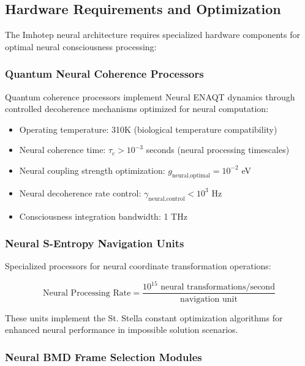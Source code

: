 \documentclass[12pt,a4paper]{article}
\theoremstyle{remark}
\begin{document}
\subsection{Hardware Requirements and Optimization}

The Imhotep neural architecture requires specialized hardware components for optimal neural consciousness processing:

\subsubsection{Quantum Neural Coherence Processors}

Quantum coherence processors implement Neural ENAQT dynamics through controlled decoherence mechanisms optimized for neural computation:

\begin{itemize}
\item Operating temperature: 310K (biological temperature compatibility)
\item Neural coherence time: $\tau_c > 10^{-3}$ seconds (neural processing timescales)
\item Neural coupling strength optimization: $g_{\text{neural,optimal}} = 10^{-2}$ eV
\item Neural decoherence rate control: $\gamma_{\text{neural,control}} < 10^3$ Hz
\item Consciousness integration bandwidth: 1 THz
\end{itemize}

\subsubsection{Neural S-Entropy Navigation Units}

Specialized processors for neural coordinate transformation operations:

\begin{equation}
\text{Neural Processing Rate} = \frac{10^{15} \text{ neural transformations/second}}{\text{navigation unit}}
\end{equation}

These units implement the St. Stella constant optimization algorithms for enhanced neural performance in impossible solution scenarios.

\subsubsection{Neural BMD Frame Selection Modules}
\end{document}
